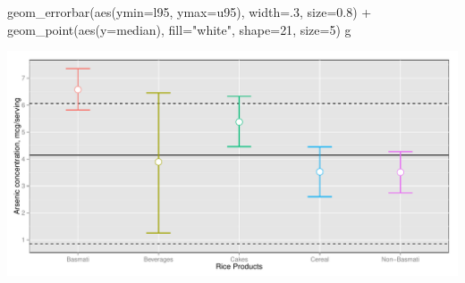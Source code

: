 \documentclass[]{article}
\newenvironment{Shaded}{\begin{snugshade}}{\end{snugshade}}
\newcommand{\KeywordTok}[1]{\textcolor[rgb]{0.94,0.87,0.69}{{#1}}}
\newcommand{\DataTypeTok}[1]{\textcolor[rgb]{0.87,0.87,0.75}{{#1}}}
\newcommand{\DecValTok}[1]{\textcolor[rgb]{0.86,0.86,0.80}{{#1}}}
\newcommand{\FloatTok}[1]{\textcolor[rgb]{0.75,0.75,0.82}{{#1}}}
\newcommand{\StringTok}[1]{\textcolor[rgb]{0.80,0.58,0.58}{{#1}}}
\newcommand{\NormalTok}[1]{\textcolor[rgb]{0.80,0.80,0.80}{{#1}}}
\begin{document}
\begin{Shaded}
\begin{Highlighting}[]
\StringTok{  }\KeywordTok{geom_errorbar}\NormalTok{(}\KeywordTok{aes}\NormalTok{(}\DataTypeTok{ymin=}\NormalTok{l95, }\DataTypeTok{ymax=}\NormalTok{u95), }\DataTypeTok{width=}\NormalTok{.}\DecValTok{3}\NormalTok{, }\DataTypeTok{size=}\FloatTok{0.8}\NormalTok{) +}
\StringTok{  }\KeywordTok{geom_point}\NormalTok{(}\KeywordTok{aes}\NormalTok{(}\DataTypeTok{y=}\NormalTok{median), }\DataTypeTok{fill=}\StringTok{"white"}\NormalTok{, }\DataTypeTok{shape=}\DecValTok{21}\NormalTok{, }\DataTypeTok{size=}\DecValTok{5}\NormalTok{) }
\NormalTok{g}
\end{Highlighting}
\end{Shaded}

\includegraphics{markdown_hw3_files/figure-latex/unnamed-chunk-10-1.pdf}
\end{document}
